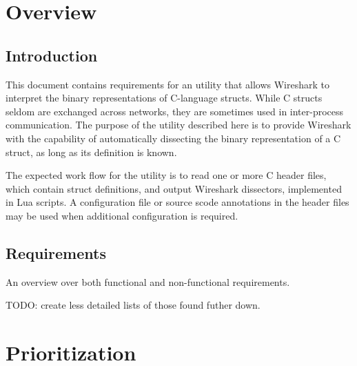 
\chapter{Overview}

\section{Introduction}
This document contains requirements for an utility that allows Wireshark to
interpret the binary representations of C-language structs. While C structs
seldom are exchanged across networks, they are sometimes used in inter-process
communication. The purpose of the utility described here is to provide
Wireshark with the capability of automatically dissecting the binary
representation of a C struct, as long as its definition is known.

The expected work flow for the utility is to read one or more C header files,
which contain struct definitions, and output Wireshark dissectors, implemented
in Lua scripts. A configuration file or source scode annotations in the header
files may be used when additional configuration is required.

\section{Requirements}
An overview over both functional and non-functional requirements.

TODO: create less detailed lists of those found futher down.

\chapter{Prioritization}

